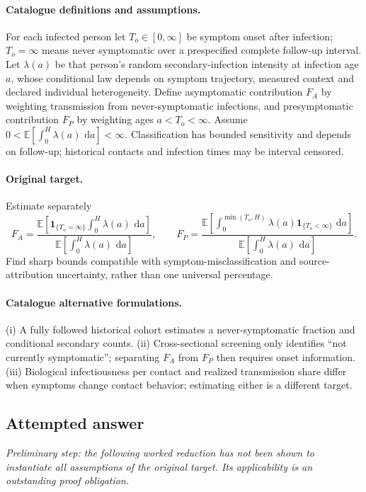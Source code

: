 \documentclass[11pt]{article}
\newcommand{\E}{\mathbb E}
\newcommand{\dd}{\,\mathrm d}
\providecommand{\E}{\mathbb E}
\begin{document}
\paragraph{Catalogue definitions and assumptions.}
For each infected person let $T_o\in[0,\infty]$ be symptom onset after infection; $T_o=\infty$ means never symptomatic over a prespecified complete follow-up interval. Let $\lambda(a)$ be that person's random secondary-infection intensity at infection age $a$, whose conditional law depends on symptom trajectory, measured context and declared individual heterogeneity. Define asymptomatic contribution $F_A$ by weighting transmission from never-symptomatic infections, and presymptomatic contribution $F_P$ by weighting ages $a<T_o<\infty$. Assume $0<\E[\int_0^H\lambda(a)\,\dd a]<\infty$. Classification has bounded sensitivity and depends on follow-up; historical contacts and infection times may be interval censored.
\paragraph{Original target.}
Estimate separately
    \[F_A=\frac{\E\!\left[\mathbf1_{\{T_o=\infty\}}\int_0^H\lambda(a)\,\dd a\right]}{\E\!\left[\int_0^H\lambda(a)\,\dd a\right]},\qquad
    F_P=\frac{\E\!\left[\int_0^{\min(T_o,H)}\lambda(a)\mathbf1_{\{T_o<\infty\}}\,\dd a\right]}{\E\!\left[\int_0^H\lambda(a)\,\dd a\right]}.\]
    Find sharp bounds compatible with symptom-misclassification and source-attribution uncertainty, rather than one universal percentage.
\paragraph{Catalogue alternative formulations.}
(i) A fully followed historical cohort estimates a never-symptomatic fraction and conditional secondary counts. (ii) Cross-sectional screening only identifies ``not currently symptomatic''; separating $F_A$ from $F_P$ then requires onset information. (iii) Biological infectiousness per contact and realized transmission share differ when symptoms change contact behavior; estimating either is a different target.
\subsection{Attempted answer}
\noindent\emph{Preliminary step: the following worked reduction has not been shown to instantiate all assumptions of the original target. Its applicability is an outstanding proof obligation.}
\end{document}
